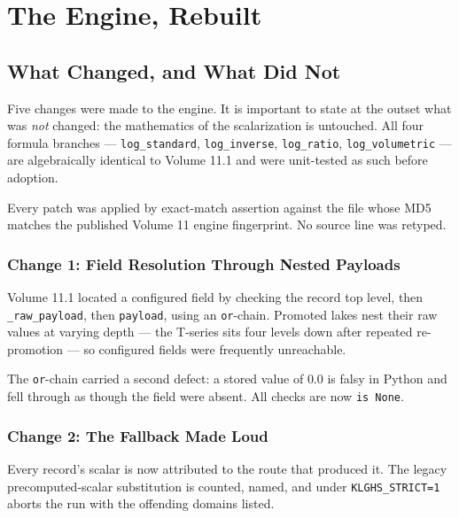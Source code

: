 \documentclass[11pt, letterpaper, openany]{book}
\begin{document}
\chapter{The Engine, Rebuilt}

\section{What Changed, and What Did Not}

Five changes were made to the engine. It is important to state at the outset what was
\emph{not} changed: the mathematics of the scalarization is untouched. All four formula
branches --- \texttt{log\_standard}, \texttt{log\_inverse}, \texttt{log\_ratio},
\texttt{log\_volumetric} --- are algebraically identical to Volume 11.1 and were unit-tested as
such before adoption.

Every patch was applied by exact-match assertion against the file whose MD5 matches the
published Volume 11 engine fingerprint. No source line was retyped.

\subsection{Change 1: Field Resolution Through Nested Payloads}

Volume 11.1 located a configured field by checking the record top level, then
\texttt{\_raw\_payload}, then \texttt{payload}, using an \texttt{or}-chain. Promoted lakes nest
their raw values at varying depth --- the T-series sits four levels down after repeated
re-promotion --- so configured fields were frequently unreachable.

The \texttt{or}-chain carried a second defect: a stored value of $0.0$ is falsy in Python and
fell through as though the field were absent. All checks are now \texttt{is None}.

\subsection{Change 2: The Fallback Made Loud}

Every record's scalar is now attributed to the route that produced it. The legacy
precomputed-scalar substitution is counted, named, and under \texttt{KLGHS\_STRICT=1} aborts
the run with the offending domains listed.
\end{document}

